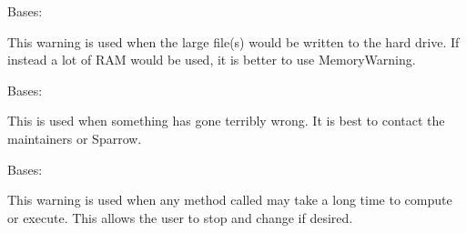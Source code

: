 \documentclass[letterpaper,10pt,english]{sphinxmanual}
\begin{document}

\begin{fulllineitems}
\label{\detokenize{docstrings/ifa_smeargle.core.error:ifa_smeargle.core.error.StorageWarning}}
Bases: {\hyperref[\detokenize{docstrings/ifa_smeargle.core.error:ifa_smeargle.core.error.Ifas_Warning}]{}}

This warning is used when the large file(s) would be written
to the hard drive. If instead a lot of RAM would be used, it is
better to use MemoryWarning.

\end{fulllineitems}


\begin{fulllineitems}
\label{\detokenize{docstrings/ifa_smeargle.core.error:ifa_smeargle.core.error.TerminalError}}
Bases: {\hyperref[\detokenize{docstrings/ifa_smeargle.core.error:ifa_smeargle.core.error.Ifas_BaseException}]{}}

This is used when something has gone terribly wrong. It is best
to contact the maintainers or Sparrow.

\end{fulllineitems}


\begin{fulllineitems}
\label{\detokenize{docstrings/ifa_smeargle.core.error:ifa_smeargle.core.error.TimeWarning}}
Bases: {\hyperref[\detokenize{docstrings/ifa_smeargle.core.error:ifa_smeargle.core.error.Ifas_Warning}]{}}

This warning is used when any method called may take a long time
to compute or execute. This allows the user to stop and change
if desired.

\end{fulllineitems}
\end{document}
